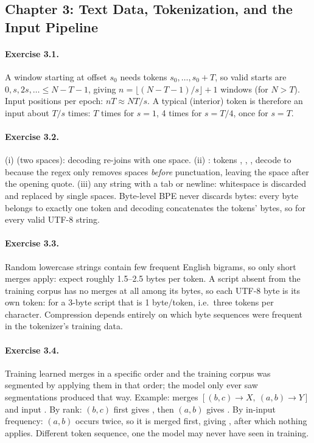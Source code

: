 \subsection*{Chapter 3: Text Data, Tokenization, and the Input Pipeline}

\paragraph{Exercise 3.1.} A window starting at offset $s_0$ needs tokens $s_0,\dots,s_0+T$, so valid
starts are $0,s,2s,\dots\le N-T-1$, giving $n=\lfloor (N-T-1)/s\rfloor+1$ windows (for $N>T$). Input
positions per epoch: $nT\approx NT/s$. A typical (interior) token is therefore an input about $T/s$
times: $T$ times for $s=1$, 4 times for $s=T/4$, once for $s=T$.

\paragraph{Exercise 3.2.} (i)  (two spaces): decoding re-joins with one space.
(ii) : tokens , , ,  decode to 
because the regex only removes spaces \emph{before} punctuation, leaving the space after the opening
quote. (iii) any string with a tab or newline: whitespace is discarded and replaced by single
spaces. Byte-level BPE never discards bytes: every byte belongs to exactly one token and decoding
concatenates the tokens' bytes, so  for every valid UTF-8 string.

\paragraph{Exercise 3.3.} Random lowercase strings contain few frequent English bigrams, so only
short merges apply: expect roughly 1.5--2.5 bytes per token. A script absent from the training
corpus has no merges at all among its bytes, so each UTF-8 byte is its own token: for a 3-byte
script that is 1 byte/token, i.e.\ three tokens per character. Compression depends entirely on which
byte sequences were frequent in the tokenizer's training data.

\paragraph{Exercise 3.4.} Training learned merges in a specific order and the training corpus was
segmented by applying them in that order; the model only ever saw segmentations produced that way.
Example: merges $[(b,c)\to X,\ (a,b)\to Y]$ and input . By rank: $(b,c)$ first gives
, then $(a,b)$ gives . By in-input frequency: $(a,b)$ occurs twice, so it is
merged first, giving , after which nothing applies. Different token sequence, one the
model may never have seen in training.

